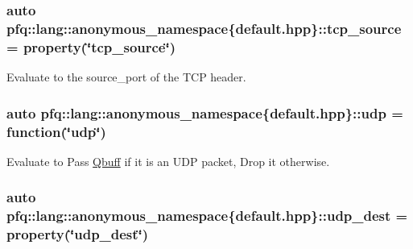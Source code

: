 \subsubsection[{\texorpdfstring{tcp\+\_\+source}{tcp_source}}]{\setlength{\rightskip}{0pt plus 5cm}auto pfq\+::lang\+::anonymous\+\_\+namespace\{default.\+hpp\}\+::tcp\+\_\+source = {\bf property}(\char`\"{}tcp\+\_\+source\char`\"{})}\hypertarget{namespacepfq_1_1lang_1_1anonymous__namespace_02default_8hpp_03_a367a9ec6d91677553073c54a059b391d}{}\label{namespacepfq_1_1lang_1_1anonymous__namespace_02default_8hpp_03_a367a9ec6d91677553073c54a059b391d}


Evaluate to the {\ttfamily source\+\_\+port} of the T\+CP header. 

\subsubsection[{\texorpdfstring{udp}{udp}}]{\setlength{\rightskip}{0pt plus 5cm}auto pfq\+::lang\+::anonymous\+\_\+namespace\{default.\+hpp\}\+::udp = {\bf function}(\char`\"{}udp\char`\"{})}\hypertarget{namespacepfq_1_1lang_1_1anonymous__namespace_02default_8hpp_03_a0b8b927aad3be7034521ebde0dabf7d3}{}\label{namespacepfq_1_1lang_1_1anonymous__namespace_02default_8hpp_03_a0b8b927aad3be7034521ebde0dabf7d3}


Evaluate to {\ttfamily Pass} \hyperlink{structpfq_1_1lang_1_1Qbuff}{Qbuff} if it is an U\+DP packet, {\ttfamily Drop} it otherwise. 

\subsubsection[{\texorpdfstring{udp\+\_\+dest}{udp_dest}}]{\setlength{\rightskip}{0pt plus 5cm}auto pfq\+::lang\+::anonymous\+\_\+namespace\{default.\+hpp\}\+::udp\+\_\+dest = {\bf property}(\char`\"{}udp\+\_\+dest\char`\"{})}\hypertarget{namespacepfq_1_1lang_1_1anonymous__namespace_02default_8hpp_03_a7c15d9ec0af24b9515acc8a04b7b1e2e}{}\label{namespacepfq_1_1lang_1_1anonymous__namespace_02default_8hpp_03_a7c15d9ec0af24b9515acc8a04b7b1e2e}


